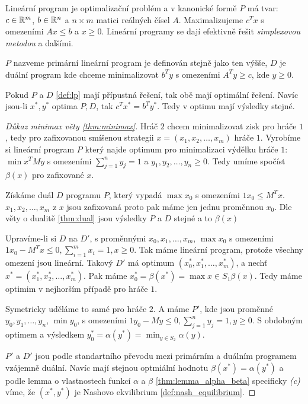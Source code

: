 \begin{definition}
\label{def:lp}
Lineární program je optimalizační problém a v kanonické formě $P$ má tvar: $c \in \mathbb{R}^m$, $b \in \mathbb{R}^n$ a $n \times m$ matici reálných čísel $A$. Maximalizujeme $c^T x$ s omezeními $Ax \leq b$ a $x \geq 0$. 
Lineární programy se dají efektivně řešit \textit{simplexovou metodou} a dalšími.

$P$ nazveme primární lineární program je definován stejně jako ten výšše, $D$ je duální program kde chceme minimalizovat $b^T y$ s omezeními $A^T y \geq c$, kde $y \geq 0$. 
\end{definition} 
\begin{theorem}
\label{thm:dual}
Pokud $P$ a $D$ \ref{def:lp} mají přípustná řešení, tak obě mají optimální řešení. 
Navíc jsou-li $x^*, y^*$ optima $P,D$, tak $c^T x^* = b^T y^*$. 
Tedy v optimu mají výsledky stejné. 
\end{theorem}
\begin{proof}[Důkaz minimax věty \ref{thm:minimax}]
Hráč $2$ chcem minimalizovat zisk pro hráče $1$, tedy pro zafixovanou smíšenou strategii $x=(x_1,x_2, \dots, x_m)$ hráče $1$. 
Vyrobíme si lineární program $P$ který najde optimum pro minimalizaci výdělku hráče $1$: $\min x^T M y$ s omezeními $\sum^n_{j=1} y_j = 1$ a $y_1, y_2, \dots, y_n \geq 0$. 
Tedy umíme spočíst $\beta(x)$ pro zafixované $x$. 

Získáme duál $D$ programu $P$, který vypadá $\max x_0$ s omezeními $1x_0 \leq M^T x$. 
$x_1,x_2, \dots, x_m$ z $x$ jsou zafixovaná proto pak máme jen jednu proměnnou $x_0$. 
Dle věty o dualitě \ref{thm:dual} jsou výsledky $P$ a $D$ stejné a to $\beta(x)$

Upravíme-li si $D$ na $D'$, s proměnnými $x_0, x_1, \dots, x_m$, $\max x_0$ s omezeními $1x_0 - M^T x \leq 0, \sum^m_{i=1}x_i = 1, x\geq 0 $. 
Tak máme lineární program, protože všechny omezení jsou lineární. 
Takový $D'$ má optimum $(x_0^*, x_1^*, \dots, x_m^*)$, a nechť $x^* = (x_1^*, x_2^*, \dots, x_m^*)$. 
Pak máme $x_0^* = \beta(x^*) = \max{x\in S_1} \beta(x)$. 
Tedy máme optimim v nejhorším případě pro hráče $1$.

Symetricky uděláme to samé pro hráče $2$. A máme $P'$, kde jsou proměnné $y_0, y_1, \dots, y_n$, $\min y_0$, s omezeními $1y_0 - My \leq 0, \sum^n_{j=1} y_j = 1, y \geq 0$. 
S obdobným optimem a výsledkem $y_0^* = \alpha(y^*) = \min_{y \in S_2} \alpha(y)$. 

$P'$ a $D'$ jsou podle standartního převodu mezi primárním a duálním programem vzájemně duální. 
Navíc mají stejnou optmiální hodnotu $\beta(x^*) = \alpha(y^*)$ a podle lemma o vlastnostech funkcí $\alpha$ a $\beta$ \ref{thm:lemma_alpha_beta} specificky \textit{(c)} víme, že $(x^*, y^*)$ je Nashovo ekvilibrium \ref{def:nash_equilibrium}.  

\end{proof}
